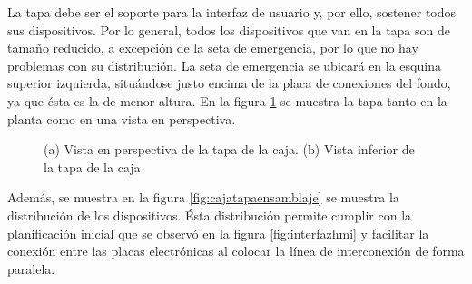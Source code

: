 La tapa debe ser el soporte para la interfaz de usuario y, por ello, sostener todos sus 
dispositivos. Por lo general, todos los dispositivos que van en la tapa son de tamaño reducido,
a excepción de la seta de emergencia, por lo que no hay problemas con su distribución. La seta
de emergencia se ubicará en la esquina superior izquierda, situándose justo encima de la placa
de conexiones del fondo, ya que ésta es la de menor altura. En la figura \ref{fig:cajatapa} se 
muestra la tapa tanto en la planta como en una vista en perspectiva.

\begin{figure}[h]%
    \centering 
    \hspace{10pt}%
    \caption{(a) Vista en perspectiva de la tapa de la caja. (b) Vista inferior de la tapa de la caja}
    \label{fig:cajatapa} 
\end{figure} 

Además, se muestra en la figura \ref{fig:cajatapaensamblaje} se muestra la distribución de los 
dispositivos. Ésta distribución permite cumplir con la planificación inicial que se observó en 
la figura \ref{fig:interfazhmi} y facilitar la conexión entre las placas electrónicas al colocar
la línea de interconexión de forma paralela.

